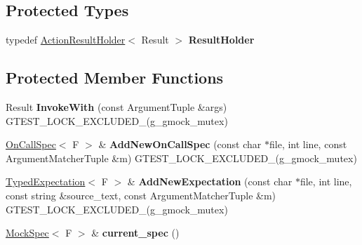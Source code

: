 \subsection*{Protected Types}
\begin{DoxyCompactItemize}
\item 
typedef \hyperlink{classtesting_1_1internal_1_1ActionResultHolder}{Action\+Result\+Holder}$<$ Result $>$ {\bfseries Result\+Holder}\hypertarget{classtesting_1_1internal_1_1FunctionMockerBase_aa4e1b2ee217676c9e70c3006b19a8074}{}\label{classtesting_1_1internal_1_1FunctionMockerBase_aa4e1b2ee217676c9e70c3006b19a8074}

\end{DoxyCompactItemize}
\subsection*{Protected Member Functions}
\begin{DoxyCompactItemize}
\item 
Result {\bfseries Invoke\+With} (const Argument\+Tuple \&args) G\+T\+E\+S\+T\+\_\+\+L\+O\+C\+K\+\_\+\+E\+X\+C\+L\+U\+D\+E\+D\+\_\+(g\+\_\+gmock\+\_\+mutex)\hypertarget{classtesting_1_1internal_1_1FunctionMockerBase_a869ec713f000b4e7829c660efc25e8cd}{}\label{classtesting_1_1internal_1_1FunctionMockerBase_a869ec713f000b4e7829c660efc25e8cd}

\item 
\hyperlink{classtesting_1_1internal_1_1OnCallSpec}{On\+Call\+Spec}$<$ F $>$ \& {\bfseries Add\+New\+On\+Call\+Spec} (const char $\ast$file, int line, const Argument\+Matcher\+Tuple \&m) G\+T\+E\+S\+T\+\_\+\+L\+O\+C\+K\+\_\+\+E\+X\+C\+L\+U\+D\+E\+D\+\_\+(g\+\_\+gmock\+\_\+mutex)\hypertarget{classtesting_1_1internal_1_1FunctionMockerBase_a22ece3b6e8d24f11d8f4ba9c17b737c4}{}\label{classtesting_1_1internal_1_1FunctionMockerBase_a22ece3b6e8d24f11d8f4ba9c17b737c4}

\item 
\hyperlink{classtesting_1_1internal_1_1TypedExpectation}{Typed\+Expectation}$<$ F $>$ \& {\bfseries Add\+New\+Expectation} (const char $\ast$file, int line, const string \&source\+\_\+text, const Argument\+Matcher\+Tuple \&m) G\+T\+E\+S\+T\+\_\+\+L\+O\+C\+K\+\_\+\+E\+X\+C\+L\+U\+D\+E\+D\+\_\+(g\+\_\+gmock\+\_\+mutex)\hypertarget{classtesting_1_1internal_1_1FunctionMockerBase_aa2c35c565f08d3649436af443ece468f}{}\label{classtesting_1_1internal_1_1FunctionMockerBase_aa2c35c565f08d3649436af443ece468f}

\item 
\hyperlink{classtesting_1_1internal_1_1MockSpec}{Mock\+Spec}$<$ F $>$ \& {\bfseries current\+\_\+spec} ()\hypertarget{classtesting_1_1internal_1_1FunctionMockerBase_a744318106e20b346f4f1efbf5a601644}{}\label{classtesting_1_1internal_1_1FunctionMockerBase_a744318106e20b346f4f1efbf5a601644}

\end{DoxyCompactItemize}
